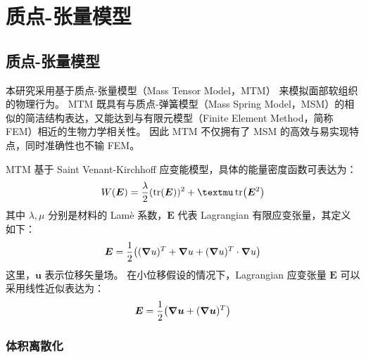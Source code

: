 
\chapter{质点-张量模型}
\label{cha:mtm}

\section{质点-张量模型}

本研究采用基于质点-张量模型（Mass Tensor Model，MTM）\cite{cotinHybridElasticModel2000} 来模拟面部软组织的物理行为。
MTM 既具有与质点-弹簧模型（Mass Spring Model，MSM）的相似的简洁结构表达，又能达到与有限元模型（Finite Element Method，简称 FEM）相近的生物力学相关性。
因此 MTM 不仅拥有了 MSM 的高效与易实现特点，同时准确性也不输 FEM。

MTM 基于 Saint Venant-Kirchhoff 应变能模型，具体的能量密度函数可表达为：
\begin{equation} \label{eq:mtm-energy}
  W(\bm{E}) = \frac{\lambda}{2} (\tr(\bm{E}))^2 + \mu \tr(\bm{E}^2)
\end{equation}
其中 $\lambda, \mu$ 分别是材料的 Lam\`e 系数，$\bm{E}$ 代表 Lagrangian 有限应变张量，其定义如下：
\begin{equation}
  \bm{E} = \frac{1}{2} \pqty{(\grad{u})^T + \grad{u} + (\grad{u})^T \cdot \grad{u}}
\end{equation}
这里，$\bm{u}$ 表示位移矢量场。
在小位移假设的情况下，Lagrangian 应变张量 $\bm{E}$ 可以采用线性近似表达为：
\begin{equation}
  \bm{E} = \frac{1}{2} \pqty{\grad{\bm{u}} + (\grad{\bm{u}})^T}
\end{equation}

\subsection{体积离散化}

